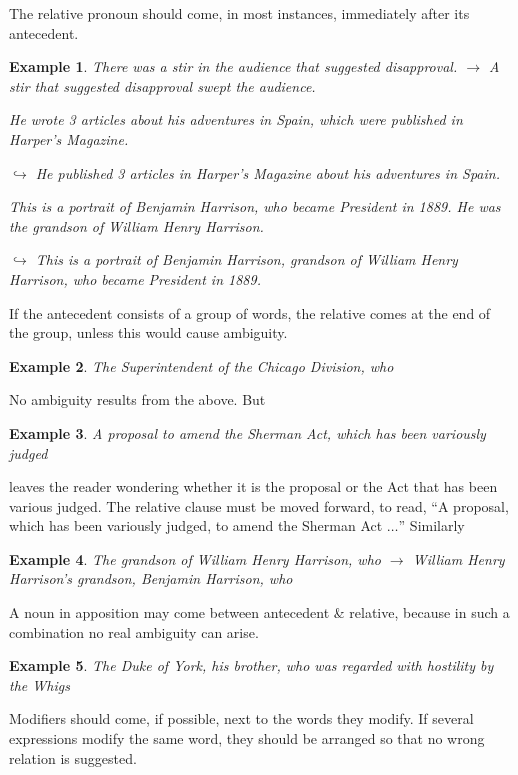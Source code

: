 \documentclass[oneside]{book}
\numberwithin{equation}{section}
\newtheorem{example}{Example}[chapter]
\begin{document}
The relative pronoun should come, in most instances, immediately after its antecedent.

\begin{example}
	There was a stir in the audience that suggested disapproval. $\to$ A stir that suggested disapproval swept the audience.
	
	He wrote 3 articles about his adventures in Spain, which were published in \emph{Harper's Magazine}.
	
	$\hookrightarrow$ He published 3 articles in \emph{Harper's Magazine} about his adventures in Spain.
	
	This is a portrait of Benjamin Harrison, who became President in 1889. He was the grandson of William Henry Harrison.
	
	$\hookrightarrow$ This is a portrait of Benjamin Harrison, grandson of William Henry Harrison, who became President in 1889.
\end{example}
If the antecedent consists of a group of words, the relative comes at the end of the group, unless this would cause ambiguity.

\begin{example}
	The Superintendent of the Chicago Division, who
\end{example}
No ambiguity results from the above. But

\begin{example}
	A proposal to amend the Sherman Act, which has been variously judged
\end{example}
leaves the reader wondering whether it is the proposal or the Act that has been various judged. The relative clause must be moved forward, to read, ``A proposal, which has been variously judged, to amend the Sherman Act $\ldots$'' Similarly

\begin{example}
	The grandson of William Henry Harrison, who $\to$ William Henry Harrison's grandson, Benjamin Harrison, who
\end{example}
A noun in apposition may come between antecedent \& relative, because in such a combination no real ambiguity can arise.

\begin{example}
	The Duke of York, his brother, who was regarded with hostility by the Whigs
\end{example}
Modifiers should come, if possible, next to the words they modify. If several expressions modify the same word, they should be arranged so that no wrong relation is suggested.
\end{document}
